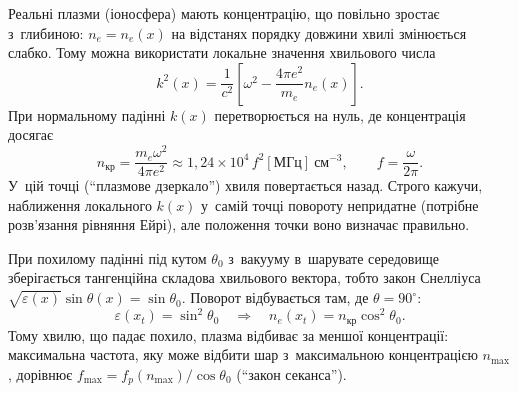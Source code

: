 Реальні плазми (іоносфера) мають концентрацію, що повільно зростає з~глибиною:
$n_e=n_e(x)$ на відстанях порядку довжини хвилі змінюється слабко. Тому можна використати
локальне значення хвильового числа
\begin{equation*}
	k^2(x)=\frac1{c^2}\left[\omega^2-\frac{4\pi e^2}{m_e}n_e(x)\right].
\end{equation*}
При нормальному падінні $k(x)$ перетворюється на нуль, де концентрація досягає
\begin{equation}\label{eq:critical-density}
	n_{\mathrm{кр}}=\frac{m_e\omega^2}{4\pi e^2}\approx1{,}24\times10^{4}\,f^2[\mathrm{МГц}]~\mathrm{см}^{-3},\qquad f=\frac\omega{2\pi}.
\end{equation}
У~цій точці (\enquote{плазмове дзеркало}) хвиля повертається назад. Строго кажучи,
наближення локального $k(x)$ у~самій точці повороту непридатне (потрібне розв'язання
рівняння Ейрі), але положення точки воно визначає правильно.

При похилому падінні під кутом $\theta_0$ з~вакууму в~шарувате середовище зберігається
тангенційна складова хвильового вектора, тобто закон Снелліуса
$\sqrt{\varepsilon(x)}\sin\theta(x)=\sin\theta_0$. Поворот відбувається там, де
$\theta=90^\circ$:
\begin{equation*}
	\varepsilon(x_t)=\sin^2\theta_0\quad\Rightarrow\quad n_e(x_t)=n_{\mathrm{кр}}\cos^2\theta_0.
\end{equation*}
Тому хвилю, що падає похило, плазма відбиває за меншої концентрації: максимальна частота,
яку може відбити шар з~максимальною концентрацією $n_{\max}$, дорівнює
$f_{\max}=f_p(n_{\max})/\cos\theta_0$ (\enquote{закон секанса}).




